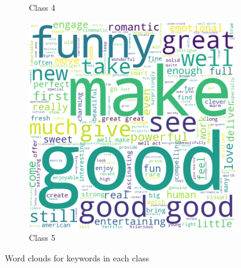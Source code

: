 \documentclass[10pt, a4paper]{article}
\begin{document}
\begin{figure}[h]
\begin{subfigure}[b]{0.18\textwidth}
         \caption{Class 4}
         \label{fig:class4cloud}
     \end{subfigure}
     \hfill
     \begin{subfigure}[b]{0.18\textwidth}
         \centering
         \includegraphics[width=\textwidth]{keywords5.png}
         \caption{Class 5}
         \label{fig:class5cloud}
     \end{subfigure}
     \hfill
    \caption{Word clouds for keywords in each class}
\label{fig:classcloud}
\end{figure}
\end{document}
